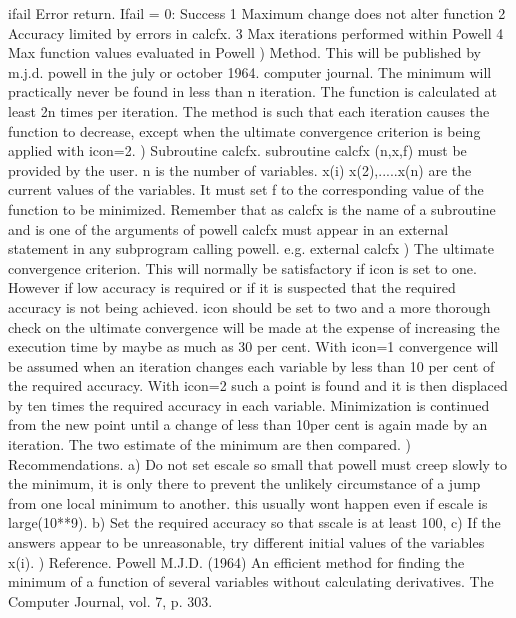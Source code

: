 {{    ifail      Error return.
               Ifail = 0:   Success
                       1    Maximum change does not alter function
                       2    Accuracy limited by errors in calcfx.
                       3    Max iterations performed within Powell
                       4    Max function values evaluated in Powell
\endtt}
{\eightpoint{}) Method.
  This will be published by m.j.d. powell in the july or october
  1964. computer journal. The minimum will practically never be
  found in less than n iteration. The function is calculated at
  least 2n times per iteration. The method is such that each
  iteration causes the function to decrease, except when the
  ultimate convergence criterion is being applied with icon=2.
\endtt}
{\eightpoint{}) Subroutine calcfx.
     subroutine calcfx (n,x,f)
  must be provided by the user. n is the number of variables. x(i)
  x(2),.....x(n) are the current values of the variables. It must
  set f to the corresponding value of the function to be minimized.
  Remember that as calcfx is the name of a subroutine and is one
  of the arguments of powell  calcfx must appear in an external
  statement in any subprogram calling powell.
  e.g.
     external calcfx
\endtt}
{\eightpoint{}) The ultimate convergence criterion.
  This will normally be satisfactory if icon is set to one.
  However if low accuracy is required or if it is suspected that the
  required accuracy is not being achieved. icon should be set to two
  and a more thorough check on the ultimate convergence will be
  made at the expense of increasing the execution time by maybe
  as much as 30 per cent. With icon=1 convergence will be assumed
  when an iteration changes each variable by less than 10 per cent
  of the required accuracy. With icon=2 such a point is found and it
  is then displaced by ten times the required accuracy in each
  variable. Minimization is continued from the new point until a
  change of less than 10per cent is again made by an iteration. The
  two estimate of the minimum are then compared.
\endtt}
{\eightpoint{}) Recommendations.
  a) Do not set escale so small that powell must creep slowly to the
  minimum, it is only there to prevent the unlikely circumstance of
  a jump from one local minimum to another. this usually wont
  happen even if  escale is large(10**9).
  b) Set the required accuracy so that sscale is at least 100,
  c) If the answers appear to be unreasonable, try different
  initial values of the variables x(i).
\endtt}
{\eightpoint{}) Reference.
     Powell M.J.D. (1964)  An efficient method for finding the
     minimum of a function of several variables without calculating
     derivatives. The Computer Journal, vol. 7, p. 303.
\endtt}
\par}
